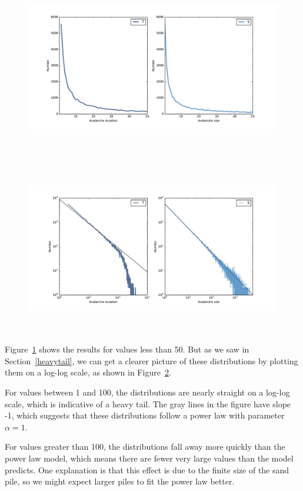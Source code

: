 \documentclass[12pt]{book}
\theoremstyle{exercise}
\begin{document}
\begin{figure}
\centerline{\includegraphics[height=3in]{figs/chap08-2.pdf}}
\caption{}
\label{chap08-2}
\end{figure}

\begin{figure}
\centerline{\includegraphics[height=3in]{figs/chap08-3.pdf}}
\caption{}
\label{chap08-3}
\end{figure}

Figure~\ref{chap08-2} shows the results for values less than 50.
But as we saw in Section~\ref{heavytail}, we can get a clearer picture of
these distributions by plotting them on a log-log scale, as shown
in Figure~\ref{chap08-3}.

For values between 1 and 100, the distributions are nearly straight
on a log-log scale, which is indicative of a heavy tail.  The
gray lines in the figure have slope -1, which suggests that these
distributions follow a power law with parameter $\alpha=1$.

For values greater than 100, the distributions fall away more quickly
than the power law model, which means there are fewer very large
values than the model predicts.  One explanation is that this
effect is due to the finite size of the sand pile, so we might
expect larger piles to fit the power law better.
\end{document}
